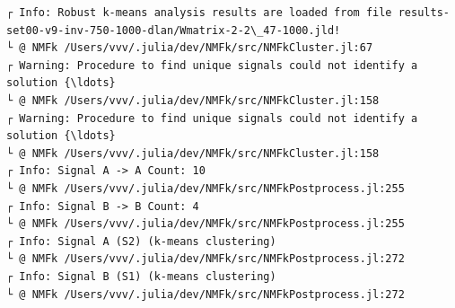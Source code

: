 \documentclass[11pt]{article}
\begin{document}
    \begin{Verbatim}[commandchars=\\\{\}]
┌ Info: Robust k-means analysis results are loaded from file results-
set00-v9-inv-750-1000-dlan/Wmatrix-2-2\_47-1000.jld!
└ @ NMFk /Users/vvv/.julia/dev/NMFk/src/NMFkCluster.jl:67
┌ Warning: Procedure to find unique signals could not identify a solution {\ldots}
└ @ NMFk /Users/vvv/.julia/dev/NMFk/src/NMFkCluster.jl:158
┌ Warning: Procedure to find unique signals could not identify a solution {\ldots}
└ @ NMFk /Users/vvv/.julia/dev/NMFk/src/NMFkCluster.jl:158
┌ Info: Signal A -> A Count: 10
└ @ NMFk /Users/vvv/.julia/dev/NMFk/src/NMFkPostprocess.jl:255
┌ Info: Signal B -> B Count: 4
└ @ NMFk /Users/vvv/.julia/dev/NMFk/src/NMFkPostprocess.jl:255
┌ Info: Signal A (S2) (k-means clustering)
└ @ NMFk /Users/vvv/.julia/dev/NMFk/src/NMFkPostprocess.jl:272
┌ Info: Signal B (S1) (k-means clustering)
└ @ NMFk /Users/vvv/.julia/dev/NMFk/src/NMFkPostprocess.jl:272
    \end{Verbatim}

    \begin{center}
    \end{center}
    { \hspace*{\fill} \\}

    \begin{Verbatim}[commandchars=\\\{\}]

    \end{Verbatim}

    \begin{center}
    \end{center}
    { \hspace*{\fill} \\}

    \begin{center}
    \end{center}
    { \hspace*{\fill} \\}

    \begin{Verbatim}[commandchars=\\\{\}]

    \end{Verbatim}
\end{document}
